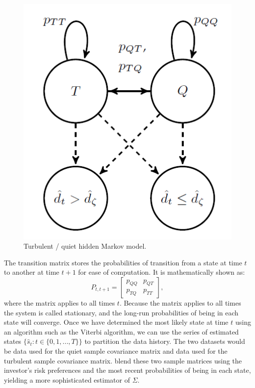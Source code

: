 \documentclass[
]{article}
\begin{document}
\begin{figure}

{\centering \includegraphics[width=5.93in]{quiet_turb_hmm} 

}

\caption{Turbulent / quiet hidden Markov model.}\label{fig:hmm}
\end{figure}

The transition matrix stores the probabilities of transition from a state at time \(t\) to another at
time \(t + 1\) for ease of computation. It is mathematically shown as:
\[P_{t, t + 1} = \begin{bmatrix} 
p_{QQ} & p_{QT} \\
p_{TQ} & p_{TT}  
\end{bmatrix},\]
where the matrix applies to all times \(t\). Because the matrix applies to all times the system is called
stationary, and the long-run probabilities of being in each state will converge. Once we have
determined the most likely state at time \(t\) using an algorithm such as the Viterbi algorithm, we can
use the series of estimated states \(\{\hat{s}_t: t \in \{0, 1, ..., T\}\}\) to partition the
data history. The two datasets would be data used for the quiet sample covariance matrix and data used
for the turbulent sample covariance matrix. \citet{FD18} blend these two sample matrices using the investor's
risk preferences and the most recent probabilities of being in each state, yielding a more
sophisticated estimator of \(\Sigma\).
\end{document}
